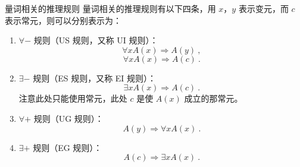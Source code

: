 


\begin{definition}{量词相关的推理规则}
量词相关的推理规则有以下四条，用 $x$，$y$ 表示变元，而 $c$ 表示常元，则可以分别表示为：
\begin{enumerate}
\item $\forall -$ 规则（US 规则，又称 UI 规则）：
\begin{equation}
\forall x A(x) \Rightarrow A(y) ~,
\end{equation}
\begin{equation}
\forall x A(x) \Rightarrow A(c) ~.
\end{equation}
\item $\exists -$ 规则（ES 规则，又称 EI 规则）：
\begin{equation}
\exists x A(x) \Rightarrow A(c) ~.
\end{equation}
注意此处只能使用常元，此处 $c$ 是使 $A(x)$ 成立的那常元。

\item $\forall +$ 规则（UG 规则）：
\begin{equation}
A(y) \Rightarrow \forall x A(x) ~.
\end{equation}

\item $\exists +$ 规则（EG 规则）：
\begin{equation}
A(c) \Rightarrow \exists x A(x) ~.
\end{equation}



\end{enumerate}

\end{definition}